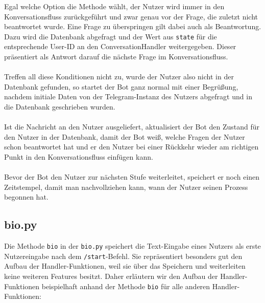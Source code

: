             Egal welche Option die Methode wählt, der Nutzer wird immer in den Konversationsfluss zurückgeführt und zwar genau vor der Frage, die zuletzt nicht beantwortet wurde. Eine Frage zu überspringen gilt dabei auch als Beantwortung. Dazu wird die Datenbank abgefragt und der Wert aus \verb|state| für die entsprechende User-ID an den ConversationHandler weitergegeben. Dieser präsentiert als Antwort darauf die nächste Frage im Konversationsfluss. \\
            \\
            Treffen all diese Konditionen nicht zu, wurde der Nutzer also nicht in der Datenbank gefunden, so startet der Bot ganz normal mit einer Begrüßung, nachdem initiale Daten von der Telegram-Instanz des Nutzers abgefragt und in die Datenbank geschrieben wurden. \\
            \\
            Ist die Nachricht an den Nutzer ausgeliefert, aktualisiert der Bot den Zustand für den Nutzer in der Datenbank, damit der Bot weiß, welche Fragen der Nutzer schon beantwortet hat und er den Nutzer bei einer Rückkehr wieder am richtigen Punkt in den Konversationsfluss einfügen kann.\\
            \\    
            Bevor der Bot den Nutzer zur nächsten Stufe weiterleitet, speichert er noch einen Zeitstempel, damit man nachvollziehen kann, wann der Nutzer seinen Prozess begonnen hat.


        \subsection{bio.py} \label{Implementierung: bio.py}
                Die Methode \verb|bio| in der \verb|bio.py| speichert die Text-Eingabe eines Nutzers als erste Nutzereingabe nach dem \verb|/start|-Befehl. Sie repräsentiert besonders gut den Aufbau der Handler-Funktionen, weil sie über das Speichern und weiterleiten keine weiteren Features besitzt. Daher erläutern wir den Aufbau der Handler-Funktionen beispielhaft anhand der Methode \verb|bio| für alle anderen Handler-Funktionen:


